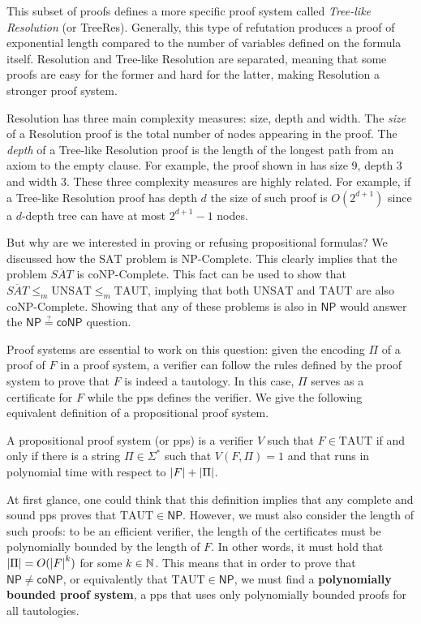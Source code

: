 This subset of proofs defines a more specific proof system called \textit{Tree-like Resolution} (or \textsf{TreeRes}). Generally, this type of refutation produces a proof of exponential length compared to the number of variables defined on the formula itself. Resolution and Tree-like Resolution are separated, meaning that some proofs are easy for the former and hard for the latter, making Resolution a stronger proof system.

Resolution has three main complexity measures: size, depth and width. The \textit{size} of a Resolution proof is the total number of nodes appearing in the proof. The \textit{depth} of a Tree-like Resolution proof is the length of the longest path from an axiom to the empty clause. For example, the proof shown in  has size 9, depth 3 and width 3. These three complexity measures are highly related. For example, if a Tree-like Resolution proof has depth $d$ the size of such proof is $O(2^{d+1})$ since a $d$-depth tree can have at most $2^{d+1}-1$ nodes.

But why are we interested in proving or refusing propositional formulas? We discussed how the $\mathrm{SAT}$ problem is \textsf{NP}-Complete. This clearly implies that the problem $\overline{SAT}$ is \textsf{coNP}-Complete. This fact can be used to show that $\overline{SAT} \leq_m \mathrm{UNSAT} \leq_m \mathrm{TAUT}$, implying that both $\mathrm{UNSAT}$ and $\mathrm{TAUT}$ are also \textsf{coNP}-Complete. Showing that any of these problems is also in $\mathsf{NP}$ would answer the $\mathsf{NP} \stackrel{?}{=} \mathsf{coNP}$ question.

Proof systems are essential to work on this question: given the encoding $\Pi$ of a proof of $F$ in a proof system, a verifier can follow the rules defined by the proof system to prove that $F$ is indeed a tautology. In this case, $\Pi$ serves as a certificate for $F$ while the pps defines the verifier. We give the following equivalent definition of a propositional proof system.

\begin{definition}
 A propositional proof system (or pps) is a verifier $V$ such that $F \in \mathrm{TAUT}$ if and only if there is a string $\Pi \in \Sigma^*$ such that $V(F,\Pi) = 1$ and that runs in polynomial time with respect to $\left|F\right| + \left|\Pi\right|$. 
\end{definition}

At first glance, one could think that this definition implies that any complete and sound pps proves that $\mathrm{TAUT} \in \mathsf{NP}$. However, we must also consider the length of such proofs: to be an efficient verifier, the length of the certificates must be polynomially bounded by the length of $F$. In other words, it must hold that $\left|\Pi\right| = O(\left|F\right|^k)$ for some $k \in \mathbb{N}$. This means that in order to prove that $\mathsf{NP} \neq \mathsf{coNP}$, or equivalently that $\mathrm{TAUT} \in \mathsf{NP}$, we must find a \textbf{polynomially bounded proof system}, a pps that uses only polynomially bounded proofs for all tautologies.

